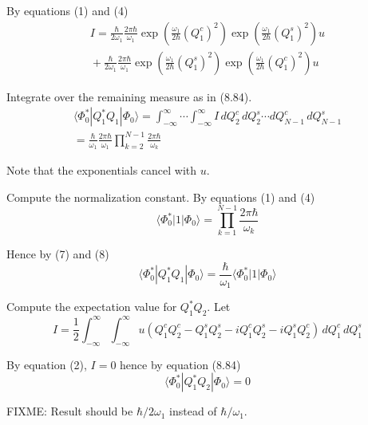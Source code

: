 \documentclass[12pt]{article}
\begin{document}
By equations (1) and (4)
\begin{multline*}
I=
\frac{\hbar}{2\omega_1}
\frac{2\pi\hbar}{\omega_1}
\exp\left(\frac{\omega_1}{2\hbar}(Q_1^c)^2\right)
\exp\left(\frac{\omega_1}{2\hbar}(Q_1^s)^2\right)
u
\\
{}+
\frac{\hbar}{2\omega_1}
\frac{2\pi\hbar}{\omega_1}
\exp\left(\frac{\omega_1}{2\hbar}(Q_1^s)^2\right)
\exp\left(\frac{\omega_1}{2\hbar}(Q_1^c)^2\right)
u
\end{multline*}

Integrate over the remaining measure as in (8.84).
\begin{multline*}
\langle\Phi_0^*|Q_1^*Q_1|\Phi_0\rangle
=\int_{-\infty}^\infty\cdots\int_{-\infty}^\infty I\,dQ_2^c\,dQ_2^s\cdots dQ_{N-1}^c\,dQ_{N-1}^s
\\
=\frac{\hbar}{\omega_1}
\frac{2\pi\hbar}{\omega_1}
\prod_{k=2}^{N-1}\frac{2\pi\hbar}{\omega_k}
\tag{7}
\end{multline*}

Note that the exponentials cancel with $u$.

\bigskip
Compute the normalization constant.
By equations (1) and (4)
\begin{equation*}
\langle\Phi_0^*|1|\Phi_0\rangle
=\prod_{k=1}^{N-1}\frac{2\pi\hbar}{\omega_k}
\tag{8}
\end{equation*}

Hence by (7) and (8)
\begin{equation*}
\langle\Phi_0^*|Q_1^*Q_1|\Phi_0\rangle=\frac{\hbar}{\omega_1}\langle\Phi_0^*|1|\Phi_0\rangle
\end{equation*}

\bigskip
Compute the expectation value for $Q_1^*Q_2$.
Let
\begin{equation*}
I=\frac{1}{2}\int_{-\infty}^\infty\int_{-\infty}^\infty
u\left(Q_1^cQ_2^c-Q_1^sQ_2^s-iQ_1^cQ_2^s-iQ_1^sQ_2^c\right)
\,dQ_1^c\,dQ_1^s
\end{equation*}

By equation (2), $I=0$ hence by equation (8.84)
\begin{equation*}
\langle\Phi_0^*|Q_1^*Q_2|\Phi_0\rangle=0
\end{equation*}

FIXME: Result should be $\hbar/2\omega_1$ instead of $\hbar/\omega_1$.
\end{document}
